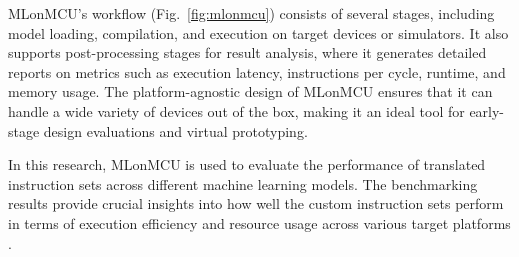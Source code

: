 MLonMCU's workflow (Fig.~\ref{fig:mlonmcu}) consists of several stages, including model loading, compilation, and execution on target devices or simulators. It also supports post-processing stages for result analysis, where it generates detailed reports on metrics such as execution latency, instructions per cycle, runtime, and memory usage. The platform-agnostic design of MLonMCU ensures that it can handle a wide variety of devices out of the box, making it an ideal tool for early-stage design evaluations and virtual prototyping.

In this research, MLonMCU is used to evaluate the performance of translated instruction sets across different machine learning models. The benchmarking results provide crucial insights into how well the custom instruction sets perform in terms of execution efficiency and resource usage across various target platforms \cite{MLonMCU}.